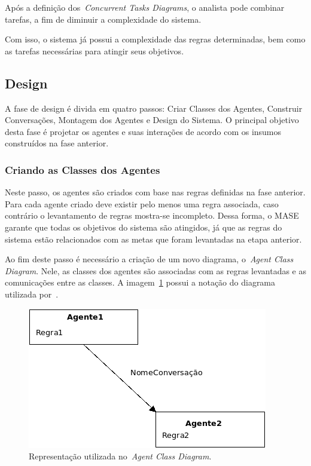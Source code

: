 Após a definição dos~\emph{Concurrent Tasks Diagrams}, o analista pode combinar tarefas, a fim de diminuir a complexidade do sistema. 

Com isso, o sistema já possui a complexidade das regras determinadas, bem como as tarefas necessárias para atingir seus objetivos.

\subsection{Design}

A fase de design é divida em quatro passos: Criar Classes dos Agentes, Construir Conversações, Montagem dos Agentes e Design do Sistema. O principal objetivo desta fase é projetar os agentes e suas interações de acordo com os insumos construídos na fase anterior.

\subsubsection{Criando as Classes dos Agentes}

Neste passo, os agentes são criados com base nas regras definidas na fase anterior. Para cada agente criado deve existir pelo menos uma regra associada, caso contrário o levantamento de regras mostra-se incompleto. Dessa forma, o MASE garante que todas os objetivos  do sistema são atingidos, já que as regras do sistema estão relacionados com as metas que foram levantadas na etapa anterior.

Ao fim deste passo é necessário a criação de um novo diagrama, o~\emph{Agent Class Diagram}. Nele, as classes dos agentes são associadas com as regras levantadas e as comunicações entre as classes. A imagem~\ref{fig:exemplo-agent-class-diagram} possui a notação do diagrama utilizada por~\cite{scott01}.

\begin{figure}
	\centering
	\includegraphics[scale=0.65]{images/exemplo-agent-class-diagram.png}
	\caption{Representação utilizada no~\emph{Agent Class Diagram}.}
	\label{fig:exemplo-agent-class-diagram}
\end{figure}

